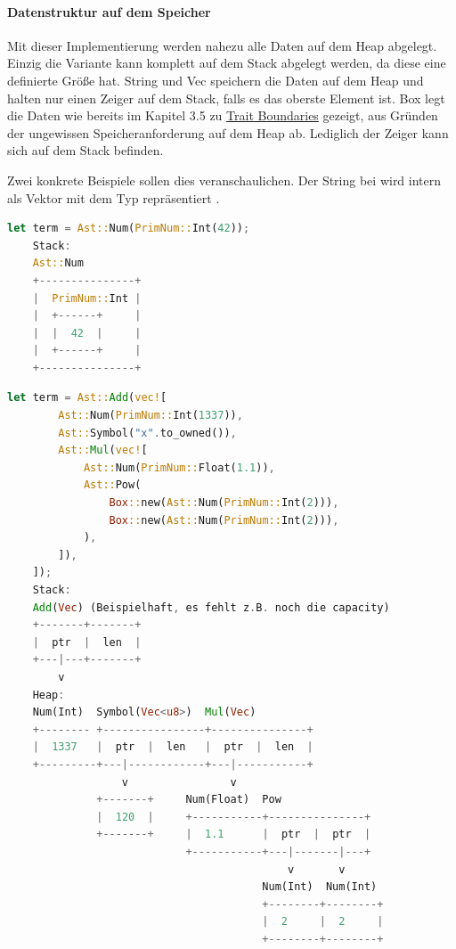 \documentclass[11pt,a4paper, ngerman]{article}
\begin{document}
\paragraph{Datenstruktur auf dem Speicher} Mit dieser Implementierung werden nahezu alle Daten auf dem Heap abgelegt. Einzig die Variante  kann komplett auf dem Stack abgelegt werden, da diese eine definierte Größe hat. String und Vec speichern die Daten auf dem Heap und halten nur einen Zeiger auf dem Stack, falls es das oberste Element ist. Box legt die Daten wie bereits im Kapitel 3.5 zu \hyperref[sec:BoxType]{Trait Boundaries} gezeigt, aus Gründen der ungewissen Speicheranforderung auf dem Heap ab. Lediglich der Zeiger kann sich auf dem Stack befinden.

Zwei konkrete Beispiele sollen dies veranschaulichen. Der String bei  wird intern als Vektor mit dem Typ  repräsentiert \cite{StringSrc}.
\begin{lstlisting}[language=rust, caption={Term 1 Stack und Heap}]
    let term = Ast::Num(PrimNum::Int(42));
    Stack:
    Ast::Num
    +---------------+
    |  PrimNum::Int |
    |  +------+     |
    |  |  42  |     |
    |  +------+     |
    +---------------+
\end{lstlisting}

\newpage

\begin{lstlisting}[language=rust, caption={Term 2 Stack und Heap}]
    let term = Ast::Add(vec![
        Ast::Num(PrimNum::Int(1337)),
        Ast::Symbol("x".to_owned()),
        Ast::Mul(vec![
            Ast::Num(PrimNum::Float(1.1)),
            Ast::Pow(
                Box::new(Ast::Num(PrimNum::Int(2))),
                Box::new(Ast::Num(PrimNum::Int(2))),
            ),
        ]),
    ]);
    Stack:
    Add(Vec) (Beispielhaft, es fehlt z.B. noch die capacity)
    +-------+-------+
    |  ptr  |  len  |
    +---|---+-------+
        v
    Heap:
    Num(Int)  Symbol(Vec<u8>)  Mul(Vec)
    +-------- +----------------+---------------+
    |  1337   |  ptr  |  len   |  ptr  |  len  |
    +---------+---|------------+---|-----------+
                  v                v
              +-------+     Num(Float)  Pow
              |  120  |     +-----------+---------------+
              +-------+     |  1.1      |  ptr  |  ptr  |
                            +-----------+---|-------|---+
                                            v       v
                                        Num(Int)  Num(Int)
                                        +--------+--------+
                                        |  2     |  2     |
                                        +--------+--------+
\end{lstlisting}
\end{document}
